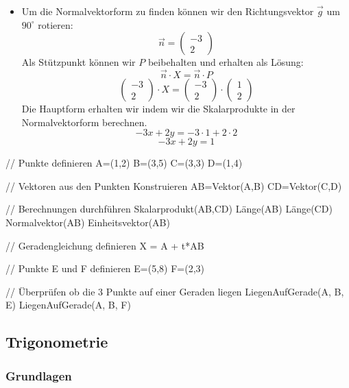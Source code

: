 \begin{loesung}
\begin{itemize}
        \item[7.] Um die Normalvektorform zu finden können wir den Richtungsvektor $\vec{g}$ um $90^\circ$ rotieren:
        \[
            \vec{n} = \begin{pmatrix} -3 \\ 2 \end{pmatrix}
        \]
        Als Stützpunkt können wir $P$ beibehalten und erhalten als Lösung: 
        \[
            \vec{n} \cdot X = \vec{n} \cdot P
        \]
        \[
            \begin{pmatrix} -3 \\ 2 \end{pmatrix} \cdot X = 
            \begin{pmatrix} -3 \\ 2 \end{pmatrix} \cdot 
            \begin{pmatrix}  1 \\ 2 \end{pmatrix} 
        \]
        Die Hauptform erhalten wir indem wir die Skalarprodukte in der Normalvektorform berechnen.
        \[
            -3x + 2y = -3 \cdot 1 + 2 \cdot 2
        \]
        \[
            -3x + 2y = 1
        \]
    \end{itemize}
\end{loesung}

\begin{geogebracode}
    // Punkte definieren
    A=(1,2)
    B=(3,5)
    C=(3,3)
    D=(1,4)

    // Vektoren aus den Punkten Konstruieren
    AB=Vektor(A,B)
    CD=Vektor(C,D)

    // Berechnungen durchführen
    Skalarprodukt(AB,CD)
    Länge(AB)
    Länge(CD)
    Normalvektor(AB)
    Einheitsvektor(AB)

    // Geradengleichung definieren
    X = A + t*AB

    // Punkte E und F definieren
    E=(5,8)
    F=(2,3)

    // Überprüfen ob die 3 Punkte auf einer Geraden liegen
    LiegenAufGerade(A, B, E)
    LiegenAufGerade(A, B, F)
\end{geogebracode}

\pagebreak
\subsection{Trigonometrie}
\subsubsection{Grundlagen}


